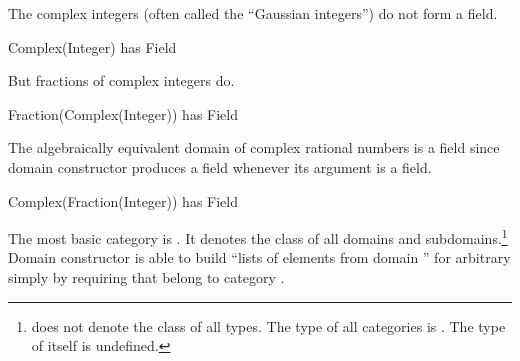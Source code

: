 \begin{xtc}
\begin{xtccomment}
The complex integers (often called the ``Gaussian integers'') do not form
a field.
\end{xtccomment}
\begin{spadsrc}
Complex(Integer) has Field
\end{spadsrc}
\begin{TeXOutput}
\begin{fricasmath}{8}
%
\end{fricasmath}
\end{TeXOutput}
\end{xtc}
\begin{xtc}
\begin{xtccomment}
But fractions of complex integers do.
\end{xtccomment}
\begin{spadsrc}
Fraction(Complex(Integer)) has Field
\end{spadsrc}
\begin{TeXOutput}
\begin{fricasmath}{9}
%
\end{fricasmath}
\end{TeXOutput}
\end{xtc}
\begin{xtc}
\begin{xtccomment}
The algebraically equivalent domain of complex rational numbers is a field
since domain constructor  produces a field whenever its
argument is a field.
\end{xtccomment}
\begin{spadsrc}
Complex(Fraction(Integer)) has Field
\end{spadsrc}
\begin{TeXOutput}
\begin{fricasmath}{10}
%
\end{fricasmath}
\end{TeXOutput}
\end{xtc}

The most basic category is .
It denotes the class of all domains and
subdomains.\footnote{ does not denote the class of
all types.
The type of all categories is .
The type of  itself is undefined.}
Domain constructor  is able to build ``lists of
elements from domain '' for arbitrary  simply by
requiring that  belong to category .

